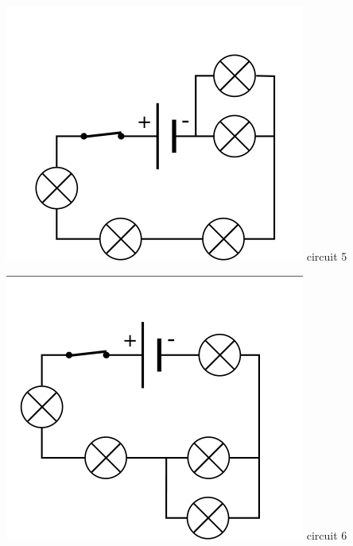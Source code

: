 \documentclass[10pt]{article}
\begin{document}
\begin{center}
	\begin{minipage}[c]{0.2\textwidth}
		\centering \includegraphics[width=0.8\columnwidth]{circuit5.png} circuit 5
	\end{minipage}
	\hspace{ 0pt}
	\begin{minipage}[c]{0.2\textwidth}
		\centering \includegraphics[width=0.8\columnwidth]{circuit6.png} circuit 6
	\end{minipage}
	\hspace{ 0pt}
	\begin{minipage}[c]{0.2\textwidth}

\end{minipage}
\end{center}
\end{document}

